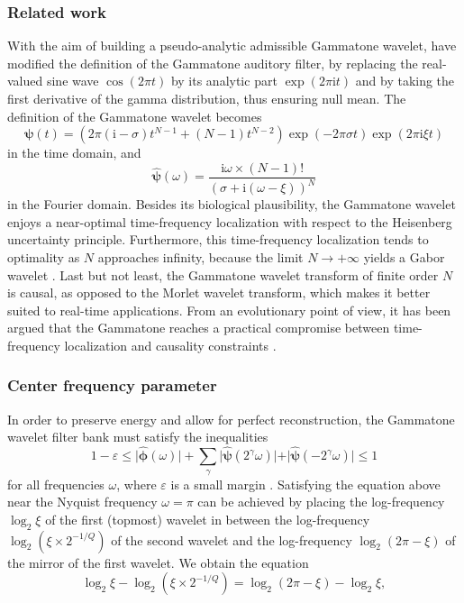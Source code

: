 \documentclass[smallextended]{svjour3}
\begin{document}
\subsubsection*{Related work}

With the aim of building a pseudo-analytic admissible Gammatone wavelet,
\cite{Venkitaraman2014} have modified the definition of the Gammatone
auditory filter, by replacing the real-valued sine wave $\cos(2\pi t)$
by its analytic part $\exp(2\pi\mathrm{\mathrm{i}}t)$ and by taking
the first derivative of the gamma distribution, thus ensuring null
mean. The definition of the Gammatone wavelet becomes
\[
\boldsymbol{\psi}(t)=\left(2\pi(\mathrm{i}-\sigma)t^{N-1}+(N-1)t^{N-2}\right)\exp(-2\pi\sigma t)\exp(2\pi\mathrm{i}\xi t)
\]
in the time domain, and
\[
\boldsymbol{\widehat{\psi}}(\omega)=\dfrac{\mathrm{i}\omega\times(N-1)!}{(\sigma+\mathrm{i}(\omega-\xi))^{N}}
\]
in the Fourier domain. Besides its biological plausibility, the Gammatone
wavelet enjoys a near-optimal time-frequency localization with respect
to the Heisenberg uncertainty principle. Furthermore, this time-frequency
localization tends to optimality as $N$ approaches infinity, because
the limit $N\rightarrow+\infty$ yields a Gabor wavelet \cite{Cohen1995}.
Last but not least, the Gammatone wavelet transform of finite order
$N$ is causal, as opposed to the Morlet wavelet transform, which
makes it better suited to real-time applications. From an evolutionary
point of view, it has been argued that the Gammatone reaches a practical
compromise between time-frequency localization and causality constraints \cite{Venkitaraman2014}.


\subsubsection*{Center frequency parameter}

In order to preserve energy and allow for perfect reconstruction,
the Gammatone wavelet filter bank must satisfy the inequalities
\[
1-\varepsilon\leq\vert\boldsymbol{\hat{\phi}}(\omega)\vert+\sum_{\gamma}\vert\boldsymbol{\hat{\psi}}(2^{\gamma}\omega)\vert+\vert\boldsymbol{\hat{\psi}}(-2^{\gamma}\omega)\vert\leq1
\]
for all frequencies $\omega$, where $\varepsilon$ is a small margin
\cite{Anden2014}. Satisfying the equation above near the Nyquist
frequency $\omega=\pi$ can be achieved by placing the log-frequency
$\log_{2}\xi$ of the first (topmost) wavelet in between the log-frequency
$\log_{2}(\xi\times2^{-1/Q})$ of the second wavelet and the log-frequency
$\log_{2}(2\pi-\xi)$ of the mirror of the first wavelet. We obtain
the equation
\[
\log_{2}\xi-\log_{2}(\xi\times2^{-1/Q})=\log_{2}(2\pi-\xi)-\log_{2}\xi,
\]
\end{document}
